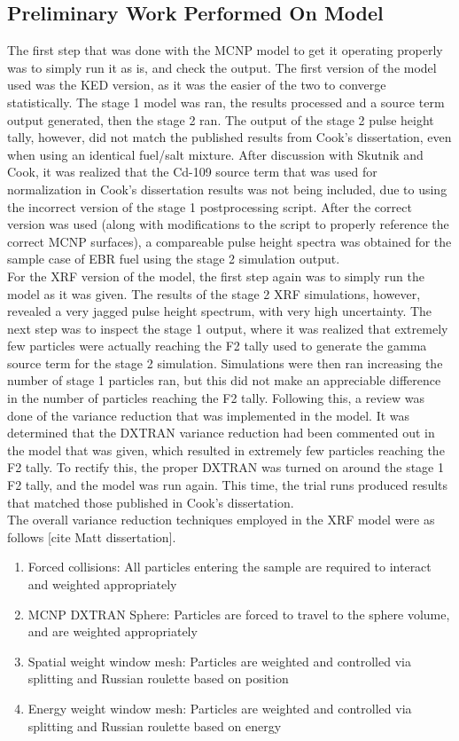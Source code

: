 \subsection{Preliminary Work Performed On Model}

The first step that was done with the MCNP model to get it operating properly was to simply run it as is, and check the output. The first version of the model used was the KED version, as it was the easier of the two to converge statistically. The stage 1 model was ran, the results processed and a source term output generated, then the stage 2 ran. The output of the stage 2 pulse height tally, however, did not match the published results from Cook's dissertation, even when using an identical fuel/salt mixture. After discussion with Skutnik and Cook, it was realized that the Cd-109 source term that was used for normalization in Cook's dissertation results was not being included, due to using the incorrect version of the stage 1 postprocessing script. After the correct version was used (along with modifications to the script to properly reference the correct MCNP surfaces), a compareable pulse height spectra was obtained for the sample case of EBR fuel using the stage 2 simulation output. \\

For the XRF version of the model, the first step again was to simply run the model as it was given. The results of the stage 2 XRF simulations, however, revealed a very jagged pulse height spectrum, with very high uncertainty. The next step was to inspect the stage 1 output, where it was realized that extremely few particles were actually reaching the F2 tally used to generate the gamma source term for the stage 2 simulation. Simulations were then ran increasing the number of stage 1 particles ran, but this did not make an appreciable difference in the number of particles reaching the F2 tally. Following this, a review was done of the variance reduction that was implemented in the model. It was determined that the DXTRAN variance reduction had been commented out in the model that was given, which resulted in extremely few particles reaching the F2 tally. To rectify this, the proper DXTRAN was turned on around the stage 1 F2 tally, and the model was run again. This time, the trial runs produced results that matched those published in Cook's dissertation. \\

The overall variance reduction techniques employed in the XRF model were as follows [cite Matt dissertation].
\begin{enumerate}
\item Forced collisions: All particles entering the sample are required to interact and weighted appropriately
\item MCNP DXTRAN Sphere: Particles are forced to travel to the sphere volume, and are weighted appropriately
\item Spatial weight window mesh: Particles are weighted and controlled via splitting and Russian roulette based on position
\item Energy weight window mesh: Particles are weighted and controlled via splitting and Russian roulette based on energy
\end{enumerate}

